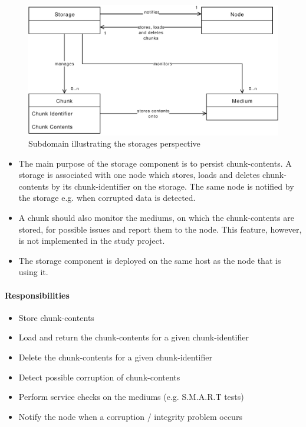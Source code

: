 \begin{figure}[h]
    \centering
    \includegraphics[width=1\linewidth]{resources/storage_domain_model}
    \caption[Storage Subdomain]{Subdomain illustrating the \gls{storage}s perspective}
\end{figure}

\begin{itemize}
    \item The main purpose of the \gls{storage} component is to persist \glspl{chunk-content}. A \gls{storage} is associated with one \gls{node} which stores, loads and deletes \glspl{chunk-content} by its \gls{chunk-identifier} on the \gls{storage}. The same \gls{node} is notified by the \gls{storage} e.g. when corrupted data is detected.
    \item A \gls{chunk} should also monitor the \glspl{medium}, on which the \glspl{chunk-content} are stored, for possible issues and report them to the \gls{node}. This feature, however, is not implemented in the study project.
    \item The \gls{storage} component is deployed on the same host as the \gls{node} that is using it.
\end{itemize}


\paragraph{Responsibilities}

\begin{itemize}
    \item Store \glspl{chunk-content}
    \item Load and return the \glspl{chunk-content} for a given \gls{chunk-identifier}
    \item Delete the \glspl{chunk-content} for a given \gls{chunk-identifier}
    \item Detect possible corruption of \glspl{chunk-content}
    \item Perform service checks on the \glspl{medium} (e.g. S.M.A.R.T tests)
    \item Notify the \gls{node} when a corruption / integrity problem occurs
\end{itemize}

